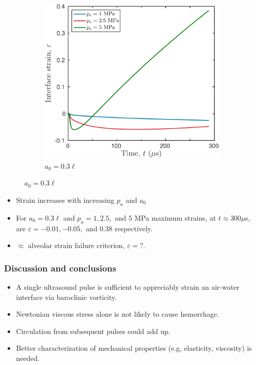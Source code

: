 \begin{frame}
\begin{figure}
\begin{subfigure}[b]{0.45\textwidth}
      \includegraphics[width=\textwidth]{../figs/lung_figs/rmawave_1_A10,25,50_a30_strain_15-Jun-2017_dim}
      \caption{\label{fig:strain_multi-pa_a30} $a_0 = 0.3\ell$}
    \end{subfigure}
  \end{figure}
  \vspace*{-0.25cm}
  \begin{itemize}
  \item Strain increases with increasing $p_a$ and $a_0$
  \item For $a_0=0.3\ell$ and $p_a = 1, 2.5,$ and $5$ MPa maximum strains, at $t \approx 300\mu$s, are $\varepsilon =-0.01, -0.05,$ and $0.38$ respectively.
  \item $\approx$ alveolar strain failure criterion, $\varepsilon = ?$.
  \end{itemize}
\end{frame}
% 
% 
\begin{frame}\frametitle{Discussion and conclusions}%
  \vfill
  \begin{itemize}
  \item A single ultrasound pulse is sufficient to appreciably strain
    an air-water interface via baroclinic vorticity.\vfill
  \item Newtonian viscous stress alone is not likely to cause
    hemorrhage.\vfill  
  \item Circulation from subsequent pulses could add up.\vfill
  \item Better characterization of mechanical properties (e.g, elasticity, viscosity) is needed.\vfill
  \end{itemize}
  \vfill
\end{frame}
